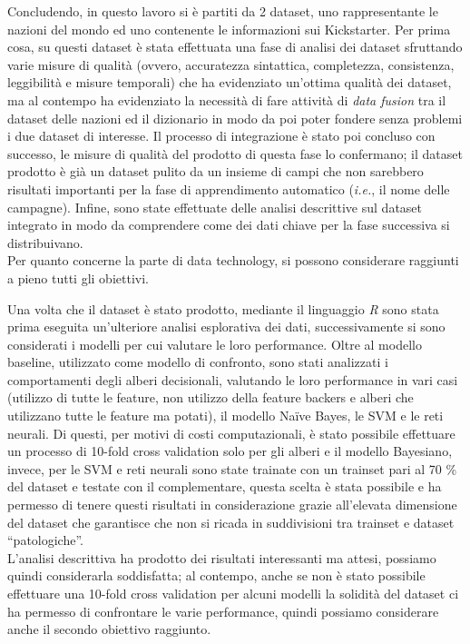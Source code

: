 Concludendo, in questo lavoro si è partiti da 2 dataset, uno rappresentante le nazioni del mondo ed uno contenente le informazioni sui Kickstarter.
Per prima cosa, su questi dataset è stata effettuata una fase di analisi dei dataset sfruttando varie misure di qualità (ovvero, accuratezza sintattica, completezza, consistenza, leggibilità e misure temporali) che ha evidenziato un'ottima qualità dei dataset, ma al contempo ha evidenziato la necessità di fare attività di \textit{data fusion} tra il dataset delle nazioni ed il dizionario in modo da poi poter fondere senza problemi i due dataset di interesse.
Il processo di integrazione è stato poi concluso con successo, le misure di qualità del prodotto di questa fase lo confermano; il dataset prodotto è già un dataset pulito da un insieme di campi che non sarebbero risultati importanti per la fase di apprendimento automatico (\textit{i.e.}, il nome delle campagne).
Infine, sono state effettuate delle analisi descrittive sul dataset integrato in modo da comprendere come dei dati chiave per la fase successiva si distribuivano.\\
Per quanto concerne la parte di data technology, si possono considerare raggiunti a pieno tutti gli obiettivi.

Una volta che il dataset è stato prodotto, mediante il linguaggio \emph{R} sono stata prima eseguita un'ulteriore analisi esplorativa dei dati, successivamente si sono considerati i modelli per cui valutare le loro performance.
Oltre al modello baseline, utilizzato come modello di confronto, sono stati analizzati i comportamenti degli alberi decisionali, valutando le loro performance in vari casi (utilizzo di tutte le feature, non utilizzo della feature backers e alberi che utilizzano tutte le feature ma potati), il modello Na\"ive Bayes, le SVM e le reti neurali.
Di questi, per motivi di costi computazionali, è stato possibile effettuare un processo di 10-fold cross validation solo per gli alberi e il modello Bayesiano, invece, per le SVM e reti neurali sono state trainate con un trainset pari al 70 \% del dataset e testate con il complementare, questa scelta è stata possibile e ha permesso di tenere questi risultati in considerazione grazie all'elevata dimensione del dataset che garantisce che non si ricada in suddivisioni tra trainset e dataset “patologiche”.\\
L'analisi descrittiva ha prodotto dei risultati interessanti ma attesi, possiamo quindi considerarla soddisfatta; al contempo, anche se non è stato possibile effettuare una 10-fold cross validation per alcuni modelli la solidità del dataset ci ha permesso di confrontare le varie performance, quindi possiamo considerare anche il secondo obiettivo raggiunto.

